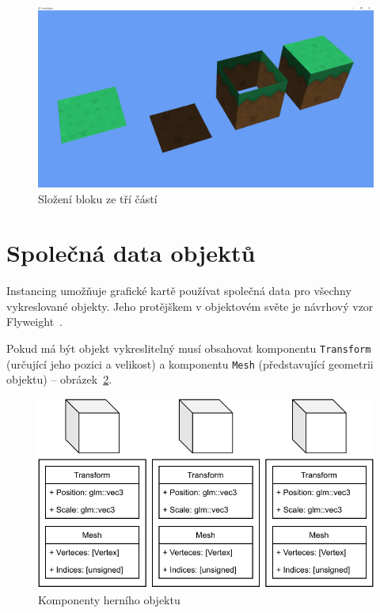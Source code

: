 \documentclass[thesis=M,czech]{FITthesis}[2019/12/23]
\begin{document}
\begin{figure}\centering
	\includegraphics[width=\textwidth]{images/block_composition}
	\caption[Složení bloku ze tří částí]{Složení bloku ze tří částí}\label{fig:block_composition}
\end{figure}

\section{Společná data objektů}

Instancing umožňuje grafické kartě používat společná data pro všechny vykreslované objekty. Jeho protějškem v objektovém světe je návrhový vzor Flyweight~\cite{gpp_fly}.

Pokud má být objekt vykreslitelný musí obsahovat komponentu \texttt{Transform} (určující jeho pozici a velikost) a komponentu \texttt{Mesh} (představující geometrii objektu) -- obrázek~\ref{fig:go_components}.

\begin{figure}\centering
	\includegraphics[width=\textwidth]{images/go_components}
	\caption[Komponenty herního objektu]{Komponenty herního objektu}\label{fig:go_components}
\end{figure}
\end{document}
